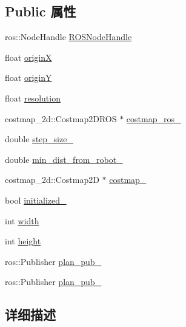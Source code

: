\subsection*{Public 属性}
\begin{DoxyCompactItemize}
\item 
ros\-::\-Node\-Handle \hyperlink{classrrt__plan_1_1rrt__planner_a9547688a6e31166034dc562a0b4608b6}{R\-O\-S\-Node\-Handle}
\item 
float \hyperlink{classrrt__plan_1_1rrt__planner_a92ba133c58a9ad0de8f425e856953ac1}{origin\-X}
\item 
float \hyperlink{classrrt__plan_1_1rrt__planner_a5cfa182b92acb4e370ba19a213a0c22a}{origin\-Y}
\item 
float \hyperlink{classrrt__plan_1_1rrt__planner_ad23ca65f53176297ae7e9f40c7edeb69}{resolution}
\item 
costmap\-\_\-2d\-::\-Costmap2\-D\-R\-O\-S $\ast$ \hyperlink{classrrt__plan_1_1rrt__planner_a3dcf8908136ace532176511eb1861528}{costmap\-\_\-ros\-\_\-}
\item 
double \hyperlink{classrrt__plan_1_1rrt__planner_a25be58fd52b495ade819f8d5785beeae}{step\-\_\-size\-\_\-}
\item 
double \hyperlink{classrrt__plan_1_1rrt__planner_aae70d5e90c66f442c8822b573645e346}{min\-\_\-dist\-\_\-from\-\_\-robot\-\_\-}
\item 
costmap\-\_\-2d\-::\-Costmap2\-D $\ast$ \hyperlink{classrrt__plan_1_1rrt__planner_ad6f48786945a4a394c95de25cd4c77d2}{costmap\-\_\-}
\item 
bool \hyperlink{classrrt__plan_1_1rrt__planner_ac1cd8655573adac056ae922a92337b8d}{initialized\-\_\-}
\item 
int \hyperlink{classrrt__plan_1_1rrt__planner_ac74fe436b5e1fa30bda1fbe821369aa2}{width}
\item 
int \hyperlink{classrrt__plan_1_1rrt__planner_a3549de56a50bff6494514878b64584df}{height}
\item 
ros\-::\-Publisher \hyperlink{classrrt__plan_1_1rrt__planner_a6beed3a62613c7e24813416185d12929}{plan\-\_\-pub\-\_\-}
\item 
ros\-::\-Publisher \hyperlink{classrrt__plan_1_1rrt__planner_a142a2d4c28bcaa2798493accf32690ee}{plan\-\_\-pub\-\_}
\end{DoxyCompactItemize}


\subsection{详细描述}



